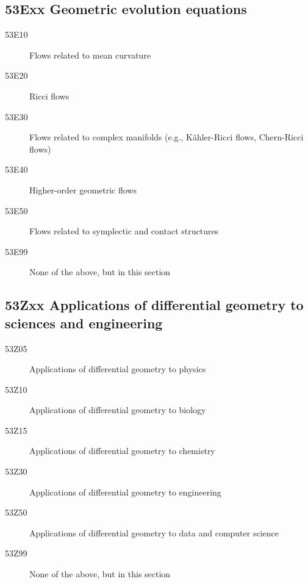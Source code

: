\subsection*{53Exx Geometric evolution equations}\label{53Exx}
\begin{description}
\item [53E10]\label{53E10} Flows related to mean curvature
\item [53E20]\label{53E20} Ricci flows
\item [53E30]\label{53E30} Flows related to complex manifolds (e.g., K\"{a}hler-Ricci flows, Chern-Ricci flows)
\item [53E40]\label{53E40} Higher-order geometric flows
\item [53E50]\label{53E50} Flows related to symplectic and contact structures
\item [53E99]\label{53E99} None of the above, but in this section
\end{description}
\subsection*{53Zxx  Applications of differential geometry to sciences and engineering}\label{53Zxx}
\begin{description} 
\item [53Z05]\label{53Z05} Applications of differential geometry to physics
\item [53Z10]\label{53Z10} Applications of differential geometry to biology
\item [53Z15]\label{53Z15} Applications of differential geometry to chemistry
\item [53Z30]\label{53Z30} Applications of differential geometry to engineering
\item [53Z50]\label{53Z50} Applications of differential geometry to data and computer science
\item [53Z99]\label{53Z99} None of the above, but in this section
\end{description}
